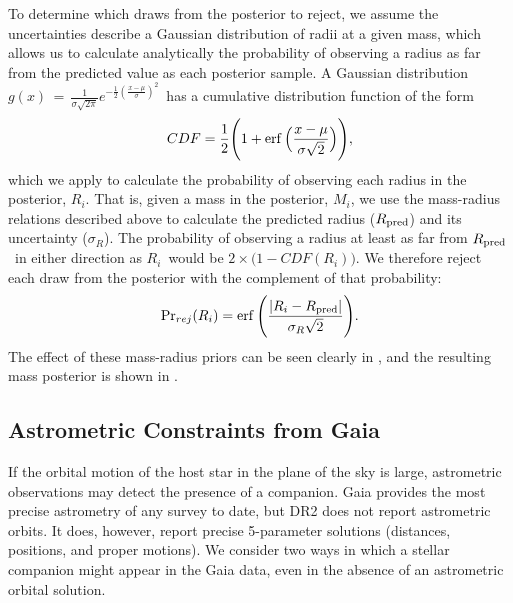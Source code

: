 \documentclass[twocolumn]{aastex63}
\begin{document}
To determine which draws from the posterior to reject, we assume the uncertainties describe a Gaussian distribution of radii at a given mass, which allows us to calculate analytically the probability of observing a radius as far from the predicted value as each posterior sample. A Gaussian distribution $g(x)\,=\,\frac{1}{\sigma\sqrt{2\pi}}e^{-\frac{1}{2}(\frac{x-\mu}{\sigma})^2}$\ has a cumulative distribution function of the form
\begin{equation}
    CDF = \frac{1}{2} \Bigg(1 + \operatorname{erf}{\Big(\frac{x - \mu}{\sigma\sqrt{2}}\Big)} \Bigg),
\end{equation}
which we apply to calculate the probability of observing each radius in the posterior, $R_i$. That is, given a mass in the posterior, $M_i$, we use the mass-radius relations described above to calculate the predicted radius ($R_{\rm pred}$) and its uncertainty ($\sigma_R$). 
The probability of observing a radius at least as far from $R_{\rm pred}$\ in either direction as $R_i$\ would be $2 \times \big(1 - CDF(R_i)\big)$. We therefore reject each draw from the posterior with the complement of that probability:
\begin{equation}
    {\Pr}_{rej}(R_i) = \operatorname{erf}{\Bigg(\frac{\lvert{R_i - R_{\rm pred}}\rvert}{\sigma_R\sqrt{2}}\Bigg)}.
\end{equation}
The effect of these mass-radius priors can be seen clearly in , and the resulting mass posterior is shown in .

\subsection{Astrometric Constraints from Gaia}
\label{sec:gaia}

If the orbital motion of the host star in the plane of the sky is large, astrometric observations may detect the presence of a companion. Gaia provides the most precise astrometry of any survey to date, but DR2 does not report astrometric orbits. It does, however, report precise 5-parameter solutions (distances, positions, and proper motions). We consider two ways in which a stellar companion might appear in the Gaia data, even in the absence of an astrometric orbital solution.
\end{document}
